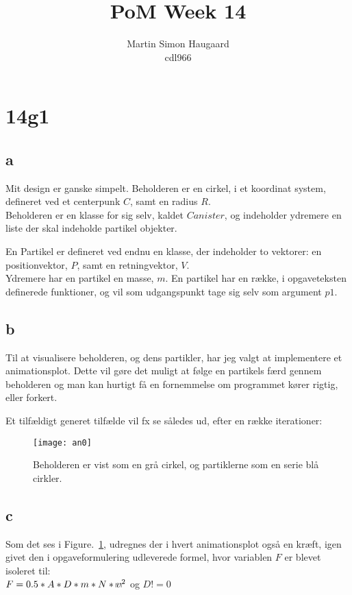 \documentclass[11pt]{article} %
\title{PoM Week 14}
\author{Martin Simon Haugaard\\cdl966}
\begin{document}
\maketitle


\section*{14g1}
\subsection*{a}

Mit design er ganske simpelt. Beholderen er en cirkel, i et koordinat system, defineret ved et centerpunk $C$,
samt en radius $R$.\\
Beholderen er en klasse for sig selv, kaldet $Canister$, og indeholder ydremere en liste der skal indeholde partikel objekter.

En Partikel er defineret ved endnu en klasse, der indeholder to vektorer: en positionvektor, $P$, samt en retningvektor, $V$.\\
Ydremere har en partikel en masse, $m$. En partikel har en række, i opgaveteksten definerede funktioner, og vil som udgangspunkt tage sig selv som argument $p1$.

\subsection*{b}
Til at visualisere beholderen, og dens partikler, har jeg valgt at implementere et animationsplot. Dette vil gøre det muligt at følge en partikels færd gennem beholderen og man kan hurtigt få en fornemmelse om programmet kører rigtig, eller forkert.

Et tilfældigt generet tilfælde vil fx se således ud, efter en række iterationer:

\begin{figure}[h!]
\centering
   \texttt{[image: an0]}
  \caption{Beholderen er vist som en grå cirkel, og partiklerne som en serie blå cirkler.}
	\label{plot1}
\end{figure}

\subsection*{c}
Som det ses i Figure.~\ref{plot1}, udregnes der i hvert animationsplot også en kræft, igen givet den i opgaveformulering udleverede formel, hvor variablen $F$ er blevet isoleret til:
\\
$F=0.5*A*D*m*N*{\vline v\vline}^2$ og $D!=0$
~
\end{document}
